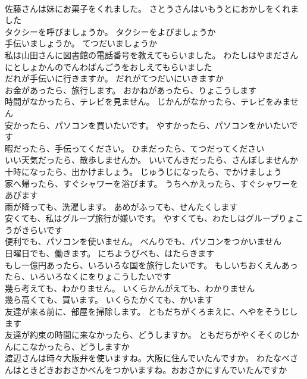 \documentclass[8pt]{extreport}
\begin{document}
\begin{CJK}{UTF8}{min}
\\	佐藤さんは妹にお菓子をくれました。	さとうさんはいもうとにおかしをくれました 
\\	タクシーを呼びましょうか。	タクシーをよびましょうか 
\\	手伝いましょうか。	てつだいましょうか 
\\	私は山田さんに図書館の電話番号を教えてもらいました。	わたしはやまださんにとしょかんのでんわばんごうをおしえてもらいました 
\\	だれが手伝いに行きますか。	だれがてつだいにいきますか 
\\	お金があったら、旅行します。	おかねがあったら、りょこうします 
\\	時間がなかったら、テレビを見ません。	じかんがなかったら、テレビをみません 
\\	安かったら、パソコンを買いたいです。	やすかったら、パソコンをかいたいです 
\\	暇だったら、手伝ってください。	ひまだったら、てつだってください 
\\	いい天気だったら、散歩しませんか。	いいてんきだったら、さんぽしませんか 
\\	十時になったら、出かけましょう。	じゅうじになったら、でかけましょう 
\\	家へ帰ったら、すぐシャワーを浴びます。	うちへかえったら、すぐシャワーをあびます 
\\	雨が降っても、洗濯します。	あめがふっても、せんたくします 
\\	安くても、私はグループ旅行が嫌いです。	やすくても、わたしはグループりょこうがきらいです 
\\	便利でも、パソコンを使いません。	べんりでも、パソコンをつかいません 
\\	日曜日でも、働きます。	にちようびべも、はたらきます 
\\	もし一億円あったら、いろいろな国を旅行したいです。	もしいちおくえんあったら、いろいろなくにをりょこうしたいです 
\\	幾ら考えても、わかりません。	いくらかんがえても、わかりません 
\\	幾ら高くても、買います。	いくらたかくても、かいます 
\\	友達が来る前に、部屋を掃除します。	ともだちがくろまえに、へやをそうじします 
\\	友達が約束の時間に来なかったら、どうしますか。	ともだちがやくそくのじかんにこなかったら、どうしますか 
\\	渡辺さんは時々大阪弁を使いますね。大阪に住んでいたんですか。	わたなべさんはときどきおおさかべんをつかいますね。おおさかにすんでいたんですか 

\end{CJK}
\end{document}
